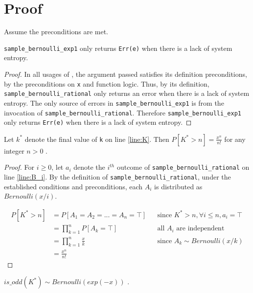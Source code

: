 \documentclass{article}
\begin{document}
\section{Proof}
Assume the preconditions are met.

\begin{lemma}
    \label{err-e}
    \texttt{sample\_bernoulli\_exp1} only returns \texttt{Err(e)} when there is a lack of system entropy.
\end{lemma}

\begin{proof}
    In all usages of , the argument passed satisfies its definition preconditions, 
    by the preconditions on \texttt{x} and function logic.
    Thus, by its definition, \texttt{sample\_bernoulli\_rational} only returns an error when there is a lack of system entropy.
    The only source of errors in \texttt{sample\_bernoulli\_exp1} is from the invocation of \texttt{sample\_bernoulli\_rational}.
    Therefore \texttt{sample\_bernoulli\_exp1} only returns \texttt{Err(e)} when there is a lack of system entropy.
\end{proof}

\begin{lemma}
    \label{P_K_gt_n}
    Let $k^{*}$ denote the final value of \texttt{k} on line \ref{line:K}.
    Then $P[K^{*} > n] = \frac{x^n}{n!}$ for any integer $n > 0$ \cite{CKS20}.
\end{lemma}

\begin{proof}
    For $i \ge 0$, let $a_i$ denote the $i^{th}$ outcome of \texttt{sample\_bernoulli\_rational} on line \ref{line:B_i}.
    By the definition of \texttt{sample\_bernoulli\_rational}, under the established conditions and preconditions,
    each $A_i$ is distributed as $Bernoulli(x / i)$.

    \begin{align*}
        P[K^{*} > n] &= P[A_1 = A_2 = ... = A_n = \top] && \text{since } K^{*} > n, \forall i \leq n, a_i = \top \\
        &= \prod_{k=1}^n P[A_k = \top] && \text{all $A_i$ are independent} \\
        &= \prod_{k=1}^n \frac{x}{k} && \text{since $A_k \sim Bernoulli(x/k)$} \\
        &= \frac{x^n}{n!}
    \end{align*}
\end{proof}

\begin{lemma}
    \label{ok-out}
    $is\_odd(K^{*}) \sim Bernoulli(exp(-x))$ \cite{CKS20}.
\end{lemma}
\end{document}
